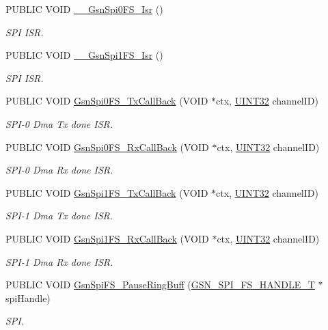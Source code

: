 \begin{DoxyCompactItemize}
PUBLIC VOID \hyperlink{a00655_ga2f78053c72cf58db8c440b189eec9419}{\_\-\_\-GsnSpi0FS\_\-Isr} ()
\begin{DoxyCompactList}\small\item\em SPI ISR. \end{DoxyCompactList}\item 
PUBLIC VOID \hyperlink{a00655_gab146a94b58d609a50c8e2a86dde0b949}{\_\-\_\-GsnSpi1FS\_\-Isr} ()
\begin{DoxyCompactList}\small\item\em SPI ISR. \end{DoxyCompactList}\item 
PUBLIC VOID \hyperlink{a00655_ga7374c14d7db873665db9ab71ed2b11a2}{GsnSpi0FS\_\-TxCallBack} (VOID $\ast$ctx, \hyperlink{a00660_gae1e6edbbc26d6fbc71a90190d0266018}{UINT32} channelID)
\begin{DoxyCompactList}\small\item\em SPI-\/0 Dma Tx done ISR. \end{DoxyCompactList}\item 
PUBLIC VOID \hyperlink{a00655_ga50385774aea507126c43ccd82ecc5b37}{GsnSpi0FS\_\-RxCallBack} (VOID $\ast$ctx, \hyperlink{a00660_gae1e6edbbc26d6fbc71a90190d0266018}{UINT32} channelID)
\begin{DoxyCompactList}\small\item\em SPI-\/0 Dma Rx done ISR. \end{DoxyCompactList}\item 
PUBLIC VOID \hyperlink{a00655_ga4f0d4aeecca4c7f5ef831a80cba40e1f}{GsnSpi1FS\_\-TxCallBack} (VOID $\ast$ctx, \hyperlink{a00660_gae1e6edbbc26d6fbc71a90190d0266018}{UINT32} channelID)
\begin{DoxyCompactList}\small\item\em SPI-\/1 Dma Tx done ISR. \end{DoxyCompactList}\item 
PUBLIC VOID \hyperlink{a00655_gab81899267cc21d0f6ff6300815b941a6}{GsnSpi1FS\_\-RxCallBack} (VOID $\ast$ctx, \hyperlink{a00660_gae1e6edbbc26d6fbc71a90190d0266018}{UINT32} channelID)
\begin{DoxyCompactList}\small\item\em SPI-\/1 Dma Rx done ISR. \end{DoxyCompactList}\item 
PUBLIC VOID \hyperlink{a00655_ga4c4df1f73de7ec7af0d04cc1804c5679}{GsnSpiFS\_\-PauseRingBuff} (\hyperlink{a00234}{GSN\_\-SPI\_\-FS\_\-HANDLE\_\-T} $\ast$spiHandle)
\begin{DoxyCompactList}\small\item\em SPI. \end{DoxyCompactList}\item 

\end{DoxyCompactItemize}
